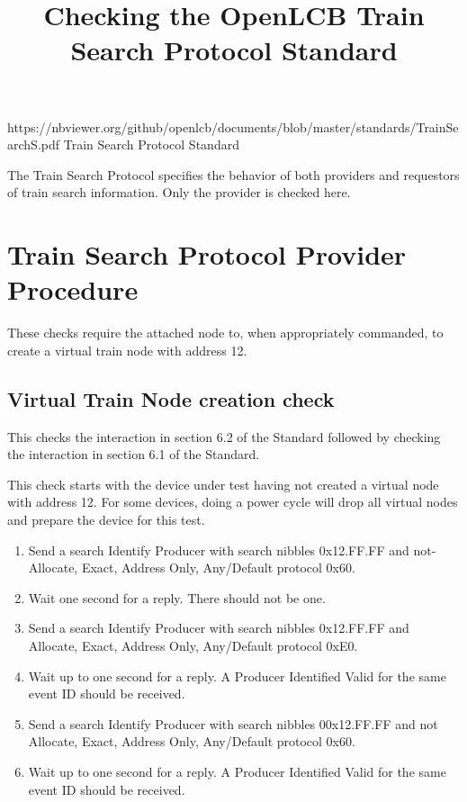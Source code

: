 

\title{Checking the OpenLCB Train Search Protocol Standard}


\maketitle


\introductionCaveats
    {https://nbviewer.org/github/openlcb/documents/blob/master/standards/TrainSearchS.pdf}
    {Train Search Protocol Standard}

The Train Search Protocol specifies the behavior of both providers and requestors of 
train search information.  Only the provider is checked here.


\section{Train Search Protocol Provider Procedure}


These checks require the attached node to, when appropriately commanded,
to create a virtual train node with address 12.

\subsection{Virtual Train Node creation check}

This checks the interaction in section 6.2 of the Standard
followed by checking the interaction in section 6.1 of the Standard.

This check starts with the device under test having not created a
virtual node with address 12. For some devices, doing a power cycle will 
drop all virtual nodes and prepare the device for this test.

\begin{enumerate}

\item Send a search Identify Producer with search nibbles 0x12.FF.FF and 
    not-Allocate, Exact, Address Only, Any/Default protocol 0x60.
    
\item Wait one second for a reply.  There should not be one.

\item Send a search Identify Producer with search nibbles 0x12.FF.FF and 
    Allocate, Exact, Address Only, Any/Default protocol 0xE0.

\item Wait up to one second for a reply.  A Producer Identified Valid for the same event ID
    should be received.

\item Send a search Identify Producer with search nibbles 00x12.FF.FF and 
    not Allocate, Exact, Address Only, Any/Default protocol 0x60.

\item Wait up to one second for a reply.  A Producer Identified Valid for the same event ID
    should be received.    

\end{enumerate}

